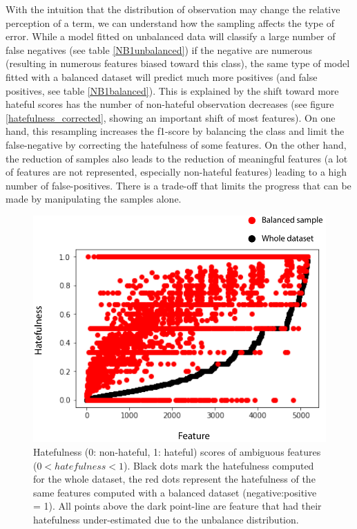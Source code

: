 \documentclass[a4paper, justified]{tufte-handout}
\begin{document}
\begin{fullwidth}
With the intuition that the distribution of observation may change the relative perception of a term, we can understand how the sampling affects the type of error. While a model fitted on unbalanced data will classify a large number of false negatives (see table \ref{NB1unbalanced}) if the negative are numerous (resulting in numerous features biased toward this class), the same type of model fitted with a balanced dataset will predict much more positives (and false positives, see table \ref{NB1balanced}). This is explained by the shift toward more hateful scores has the number of non-hateful observation decreases (see figure \ref{hatefulness_corrected}, showing an important shift of most features). On one hand, this resampling increases the f1-score by balancing the class and limit the false-negative by correcting the hatefulness of some features. On the other hand, the reduction of samples also leads to the reduction of meaningful features (a lot of features are not represented, especially non-hateful features) leading to a high number of false-positives. There is a trade-off that limits the progress that can be made by manipulating the samples alone.

\begin{figure}\label{hatefulness_corrected}
  \includegraphics[]{images/hatefulness_corrected.pdf}
  \caption{Hatefulness (0: non-hateful, 1: hateful) scores of ambiguous features ($0 < hatefulness < 1$). Black dots mark the hatefulness computed for the whole dataset, the red dots represent the hatefulness of the same features computed with a balanced dataset (negative:positive = 1). All points above the dark point-line are feature that had their hatefulness under-estimated due to the unbalance  distribution.}
  \label{fig:marginfig}
\end{figure}




\end{fullwidth}
\end{document}
